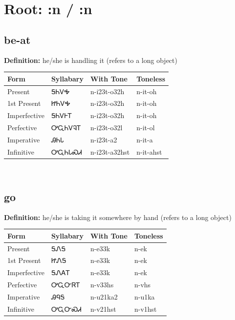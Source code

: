 \documentclass{article}%
\begin{document}
%
\normalsize%
\section*{Root: :n / :n}%
\subsection*{be-at}%
\textbf{Definition: }%
he/she is handling it (refers to a long object)%
\\[0.5em]%
\begin{tabular}{|l|l|l|l|}%
\hline%
\textbf{Form}&\textbf{Syllabary}&\textbf{With Tone}&\textbf{Toneless}\\%
\hline%
Present&ᎦᏂᏙᎭ&n{-}i23t{-}o32h&n{-}it{-}oh\\%
1st Present&ᏥᏂᏙᎭ&n{-}i23t{-}o32h&n{-}it{-}oh\\%
Imperfective&ᎦᏂᏙᎰᎢ&n{-}i23t{-}o32h&n{-}it{-}oh\\%
Perfective&ᎤᏩᏂᏙᎸᎢ&n{-}i23t{-}o32l&n{-}it{-}ol\\%
Imperative&ᎯᏂᏓ&n{-}i23t{-}a2&n{-}it{-}a\\%
Infinitive&ᎤᏩᏂᏓᏍᏗ&n{-}i23t{-}a32hst&n{-}it{-}ahst\\%
\hline%
\end{tabular}%
\\[1em]%
\subsection*{go}%
\textbf{Definition: }%
he/she is taking it somewhere by hand (refers to a long object)%
\\[0.5em]%
\begin{tabular}{|l|l|l|l|}%
\hline%
\textbf{Form}&\textbf{Syllabary}&\textbf{With Tone}&\textbf{Toneless}\\%
\hline%
Present&ᎦᏁᎦ&n{-}e33k&n{-}ek\\%
1st Present&ᏥᏁᎦ&n{-}e33k&n{-}ek\\%
Imperfective&ᎦᏁᎪᎢ&n{-}e33k&n{-}ek\\%
Perfective&ᎤᏩᏅᏒᎢ&n{-}v33hs&n{-}vhs\\%
Imperative&ᎯᏄᎦ&n{-}u21ka2&n{-}u1ka\\%
Infinitive&ᎤᏩᏅᏍᏗ&n{-}v21hst&n{-}v1hst\\%
\hline%
\end{tabular}%
\\[1em]%
\end{document}
